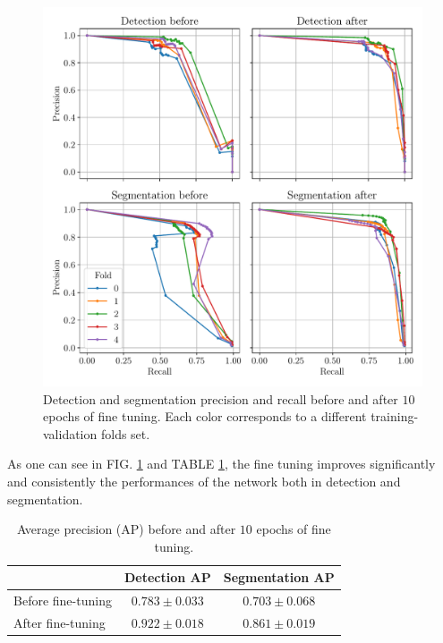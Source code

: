 \documentclass[twocolumn,superscriptaddress,aps,nofootinbib]{revtex4-1}
\begin{document}
\begin{figure}[h]
    \centering
    \vspace{-1em}
    \includegraphics[width=\columnwidth]{resources/pdf/before_after.pdf}
    \vspace{-2em}
    \caption{Detection and segmentation precision and recall before and after $10$ epochs of fine tuning. Each color corresponds to a different training-validation folds set.}
    \label{fig:before_after}
\end{figure}

As one can see in FIG. \ref{fig:before_after} and TABLE \ref{tab:before_after}, the fine tuning improves significantly and consistently the performances of the network both in detection and segmentation.

\begin{table}[h]
    \begin{tabular}{l|c|c}
                       & Detection AP & Segmentation AP \\ \hline
    Before fine-tuning & $0.783 \pm 0.033$ & $0.703 \pm 0.068$ \\ 
    After fine-tuning  & $0.922 \pm 0.018$ & $0.861 \pm 0.019$ \\       
    \end{tabular}
    \caption{Average precision (AP) before and after $10$ epochs of fine tuning.}
    \label{tab:before_after}
\end{table}
\end{document}
